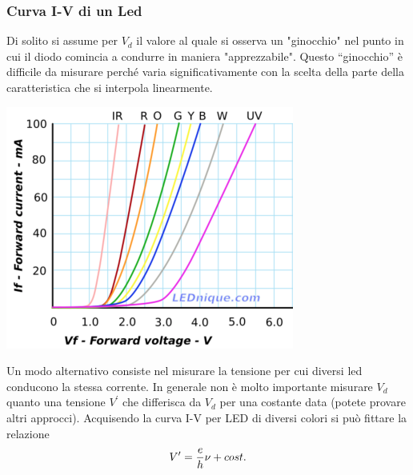 \frame
{
  \frametitle{Curva I-V di un Led}

  \begin{minipage}{0.5\linewidth}{
      Di solito si assume per $V_d$ il valore al quale si osserva un "ginocchio" nel punto in cui il diodo comincia a condurre in maniera "apprezzabile".
\vskip 0.1cm
      Questo ``ginocchio'' \`e difficile da misurare
  perch\'e varia significativamente con la scelta della parte della caratteristica che si interpola linearmente.
  }\end{minipage}\hfill\begin{minipage}{0.45\linewidth}{
    \includegraphics[width=0.8\linewidth]{figs/LedIV.png}
  }\end{minipage}
  \vskip 0.1cm

  Un modo alternativo consiste nel misurare la tensione per cui diversi led conducono la stessa corrente.
  \vskip 0.1cm
  In generale non \`e molto importante misurare $V_d$ quanto una tensione $V^{\prime}$ che differisca da $V_d$ per una costante data
  (potete provare altri approcci).
  \vskip 0.1cm
  Acquisendo la curva I-V per LED di diversi colori si pu\`o fittare la relazione
  \begin{align*}
      V^{\prime} = {e\over h} \nu + cost.
  \end{align*}


}

